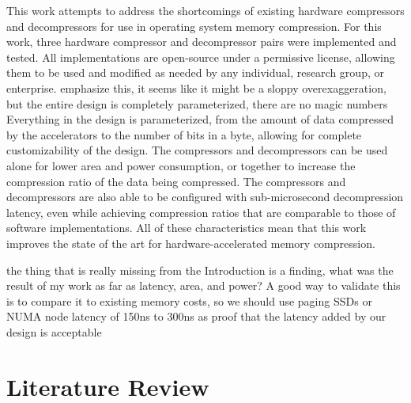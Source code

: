 \documentclass[doublespace,draft,nopageskip]{VTthesis} %
\begin{document}
This work attempts to address the shortcomings of existing hardware compressors and decompressors for use in operating system memory compression. For this work, three hardware compressor and decompressor pairs were implemented and tested. All implementations are open-source under a permissive license, allowing them to be used and modified as needed by any individual, research group, or enterprise. {\color{red} emphasize this, it seems like it might be a sloppy overexaggeration, but the entire design is completely parameterized, there are no magic numbers} Everything in the design is parameterized, from the amount of data compressed by the accelerators to the number of bits in a byte, allowing for complete customizability of the design. The compressors and decompressors can be used alone for lower area and power consumption, or together to increase the compression ratio of the data being compressed. The compressors and decompressors are also able to be configured with sub-microsecond decompression latency, even while achieving compression ratios that are comparable to those of software implementations. All of these characteristics mean that this work improves the state of the art for hardware-accelerated memory compression.

{\color{red} the thing that is really missing from the Introduction is a finding, what was the result of my work as far as latency, area, and power? A good way to validate this is to compare it to existing memory costs, so we should use paging SSDs or NUMA node latency of 150ns to 300ns as proof that the latency added by our design is acceptable}
	

\chapter{Literature Review} \label{ch:related_works}
\end{document}

